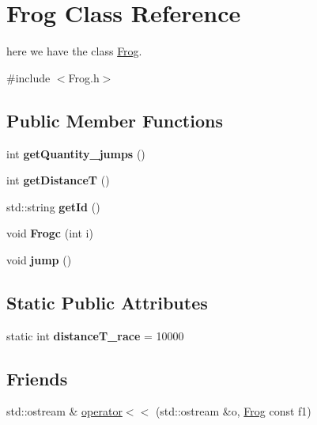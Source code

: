 \hypertarget{classFrog}{}\section{Frog Class Reference}
\label{classFrog}


here we have the class \hyperlink{classFrog}{Frog}.  




{\ttfamily \#include $<$Frog.\+h$>$}

\subsection*{Public Member Functions}
\begin{DoxyCompactItemize}
\item 
\mbox{\label{classFrog_a091187fa5771108a94560eac1eafcc02}} 
int {\bfseries get\+Quantity\+\_\+jumps} ()
\item 
\mbox{\label{classFrog_acf536c2f4af0861fb860ce9741d2e31a}} 
int {\bfseries get\+DistanceT} ()
\item 
\mbox{\label{classFrog_acc485404b4ccafcf7b879acf3565f4bc}} 
std\+::string {\bfseries get\+Id} ()
\item 
\mbox{\label{classFrog_ad2302ad999bccd131a9d9ae801404e59}} 
void {\bfseries Frogc} (int i)
\item 
\mbox{\label{classFrog_a1bf0c82ac464c570549901eafff40584}} 
void {\bfseries jump} ()
\end{DoxyCompactItemize}
\subsection*{Static Public Attributes}
\begin{DoxyCompactItemize}
\item 
\mbox{\label{classFrog_a108da4572a3d94d37f7e8a11714d7cbf}} 
static int {\bfseries distance\+T\+\_\+race} = 10000
\end{DoxyCompactItemize}
\subsection*{Friends}
\begin{DoxyCompactItemize}
\item 
std\+::ostream \& \hyperlink{classFrog_a63caf8bfed035c0ecc5f3954119f34c2}{operator$<$$<$} (std\+::ostream \&o, \hyperlink{classFrog}{Frog} const f1)
\end{DoxyCompactItemize}


